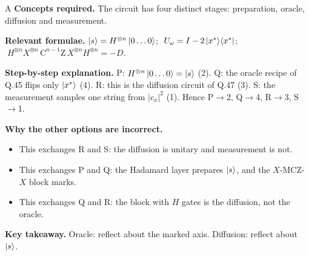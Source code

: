 \documentclass[11pt,a4paper]{article}
\newcommand{\qsep}{\par\vspace{2pt}{\color{black!15}\hrule}\vspace{4pt}}
\begin{document}
\begin{solbox}{A}
\textbf{\color{brand}Concepts required.} The circuit has four distinct stages: preparation, oracle, diffusion and measurement.

\textbf{\color{brand}Relevant formulae.} $\ket{s} = H^{\otimes n}\ket{0\dots0}$; $\;U_\omega = I - 2\ket{x^\ast}\!\bra{x^\ast}$; $\;H^{\otimes n}X^{\otimes n}\,\mathrm{C}^{n-1}\mathrm{Z}\,X^{\otimes n}H^{\otimes n} = -D$.

\textbf{\color{brand}Step-by-step explanation.} P: $H^{\otimes n}\ket{0\dots0} = \ket{s}$ (2). Q: the oracle recipe of Q.45 flips only $\ket{x^\ast}$ (4). R: this is the diffusion circuit of Q.47 (3). S: the measurement samples one string from $|c_x|^2$ (1).
Hence P$\to$2, Q$\to$4, R$\to$3, S$\to$1.

\textbf{\color{brand}Why the other options are incorrect.}
\begin{itemize}[leftmargin=2.4em, itemsep=1pt, topsep=2pt]
\item[\textbf{(B)}] This exchanges R and S: the diffusion is unitary and measurement is not.
\item[\textbf{(C)}] This exchanges P and Q: the Hadamard layer prepares $\ket{s}$, and the $X$-MCZ-$X$ block marks.
\item[\textbf{(D)}] This exchanges Q and R: the block with $H$ gates is the diffusion, not the oracle.
\end{itemize}
\textbf{\color{brand}Key takeaway.} Oracle: reflect about the marked axis. Diffusion: reflect about $\ket{s}$.
\end{solbox}
\qsep
\end{document}
